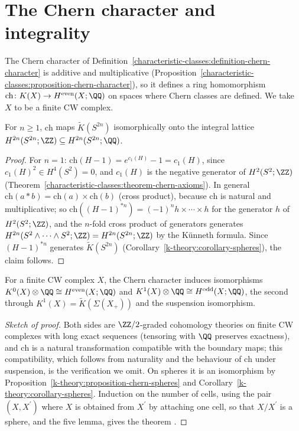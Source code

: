 \section{The Chern character and integrality}\label{k-theory:section-chern-character}

The Chern character of Definition~\ref{characteristic-classes:definition-chern-character} is additive and multiplicative
(Proposition~\ref{characteristic-classes:proposition-chern-character}), so it defines a ring homomorphism $\mathrm{ch} \colon K(X) \to H^{\mathrm{even}}(X; \QQ)$ on spaces where Chern classes are defined.
We take $X$ to be a finite CW complex.

\begin{proposition}\label{k-theory:proposition-chern-spheres}
For $n \geq 1$, $\mathrm{ch}$ maps $\tilde{K}(S^{2n})$ isomorphically onto the integral lattice $H^{2n}(S^{2n}; \ZZ) \subseteq H^{2n}(S^{2n}; \QQ)$.
\end{proposition}

\begin{proof}
For $n = 1$: $\mathrm{ch}(H - 1) = e^{c_1(H)} - 1 = c_1(H)$, since $c_1(H)^2 \in H^4(S^2) = 0$, and $c_1(H)$ is the negative generator of $H^2(S^2; \ZZ)$ (Theorem~\ref{characteristic-classes:theorem-chern-axioms}).
In general $\mathrm{ch}(a * b) = \mathrm{ch}(a) \times \mathrm{ch}(b)$ (cross product), because $\mathrm{ch}$ is natural and multiplicative; so $\mathrm{ch}((H - 1)^{*n}) = (-1)^n h \times \cdots \times h$ for the generator
$h$ of $H^2(S^2; \ZZ)$, and the $n$-fold cross product of generators generates $H^{2n}(S^2 \wedge \cdots \wedge S^2; \ZZ) = H^{2n}(S^{2n}; \ZZ)$ by the K\"unneth formula. Since $(H - 1)^{*n}$ generates
$\tilde{K}(S^{2n})$ (Corollary~\ref{k-theory:corollary-spheres}), the claim follows.
\end{proof}

\begin{theorem}\label{k-theory:theorem-chern-iso}
For a finite CW complex $X$, the Chern character induces isomorphisms $K^0(X) \otimes \QQ \cong H^{\mathrm{even}}(X; \QQ)$ and $K^1(X) \otimes \QQ \cong H^{\mathrm{odd}}(X; \QQ)$, the second through
$K^1(X) = \tilde{K}(\Sigma(X_+))$ and the suspension isomorphism.
\end{theorem}

\begin{proof}[Sketch of proof]
Both sides are $\ZZ/2$-graded cohomology theories on finite CW complexes with long exact sequences (tensoring with $\QQ$ preserves exactness), and $\mathrm{ch}$ is a natural transformation compatible with the
boundary maps; this compatibility, which follows from naturality and the behaviour of $\mathrm{ch}$ under suspension, is the verification we omit. On spheres it is an isomorphism by
Proposition~\ref{k-theory:proposition-chern-spheres} and Corollary~\ref{k-theory:corollary-spheres}. Induction on the number of cells, using the pair $(X, X^{\prime})$ where $X$ is obtained from $X^{\prime}$
by attaching one cell, so that $X/X^{\prime}$ is a sphere, and the five lemma, gives the theorem \cite{atiyah-k-theory}.
\end{proof}

